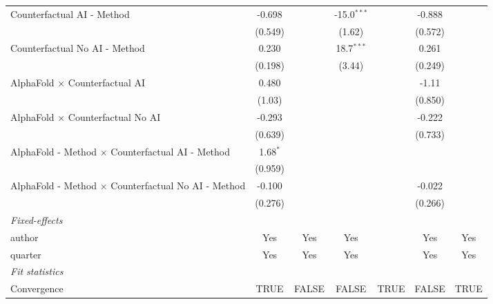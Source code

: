 \begin{tabular}{lcccccc}
   Counterfactual AI - Method                                 & -0.698     &         & -15.0$^{***}$ &      & -0.888  &   \\   
                                                              & (0.549)    &         & (1.62)        &      & (0.572) &   \\   
   Counterfactual No AI - Method                              & 0.230      &         & 18.7$^{***}$  &      & 0.261   &   \\   
                                                              & (0.198)    &         & (3.44)        &      & (0.249) &   \\   
   AlphaFold $\times$ Counterfactual AI                       & 0.480      &         &               &      & -1.11   &   \\   
                                                              & (1.03)     &         &               &      & (0.850) &   \\   
   AlphaFold $\times$ Counterfactual No AI                    & -0.293     &         &               &      & -0.222  &   \\   
                                                              & (0.639)    &         &               &      & (0.733) &   \\   
   AlphaFold - Method $\times$ Counterfactual AI - Method     & 1.68$^{*}$ &         &               &      &         &   \\   
                                                              & (0.959)    &         &               &      &         &   \\   
   AlphaFold - Method $\times$ Counterfactual No AI - Method  & -0.100     &         &               &      & -0.022  &   \\   
                                                              & (0.276)    &         &               &      & (0.266) &   \\   
   \midrule
   \emph{Fixed-effects}\\
   author                                                     & Yes        & Yes     & Yes           &      & Yes     & Yes\\  
   quarter                                                    & Yes        & Yes     & Yes           &      & Yes     & Yes\\  
   \midrule
   \emph{Fit statistics}\\
   Convergence                                                &TRUE        & FALSE   & FALSE         & TRUE & FALSE   & TRUE\\  

\end{tabular}
